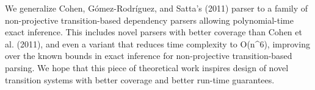 We generalize Cohen, Gómez-Rodríguez, and Satta's (2011) parser to a family of non-projective transition-based dependency parsers allowing polynomial-time exact inference. This includes novel parsers with better coverage than Cohen et al. (2011), and even a variant that reduces time complexity to O(n^6), improving over the known bounds in exact inference for non-projective transition-based parsing. We hope that this piece of theoretical work inspires design of novel transition systems with better coverage and better run-time guarantees.

